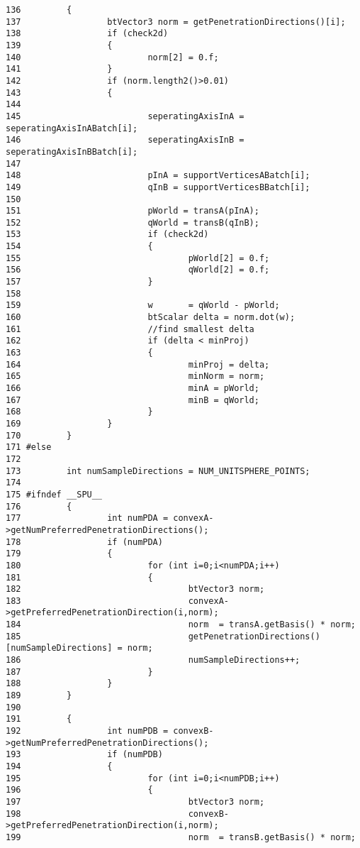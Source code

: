 \begin{Code}
\begin{verbatim}
136         {
137                 btVector3 norm = getPenetrationDirections()[i];
138                 if (check2d)
139                 {
140                         norm[2] = 0.f;
141                 }
142                 if (norm.length2()>0.01)
143                 {
144 
145                         seperatingAxisInA = seperatingAxisInABatch[i];
146                         seperatingAxisInB = seperatingAxisInBBatch[i];
147 
148                         pInA = supportVerticesABatch[i];
149                         qInB = supportVerticesBBatch[i];
150 
151                         pWorld = transA(pInA);  
152                         qWorld = transB(qInB);
153                         if (check2d)
154                         {
155                                 pWorld[2] = 0.f;
156                                 qWorld[2] = 0.f;
157                         }
158 
159                         w       = qWorld - pWorld;
160                         btScalar delta = norm.dot(w);
161                         //find smallest delta
162                         if (delta < minProj)
163                         {
164                                 minProj = delta;
165                                 minNorm = norm;
166                                 minA = pWorld;
167                                 minB = qWorld;
168                         }
169                 }
170         }       
171 #else
172 
173         int numSampleDirections = NUM_UNITSPHERE_POINTS;
174 
175 #ifndef __SPU__
176         {
177                 int numPDA = convexA->getNumPreferredPenetrationDirections();
178                 if (numPDA)
179                 {
180                         for (int i=0;i<numPDA;i++)
181                         {
182                                 btVector3 norm;
183                                 convexA->getPreferredPenetrationDirection(i,norm);
184                                 norm  = transA.getBasis() * norm;
185                                 getPenetrationDirections()[numSampleDirections] = norm;
186                                 numSampleDirections++;
187                         }
188                 }
189         }
190 
191         {
192                 int numPDB = convexB->getNumPreferredPenetrationDirections();
193                 if (numPDB)
194                 {
195                         for (int i=0;i<numPDB;i++)
196                         {
197                                 btVector3 norm;
198                                 convexB->getPreferredPenetrationDirection(i,norm);
199                                 norm  = transB.getBasis() * norm;

\end{verbatim}
\end{Code}

